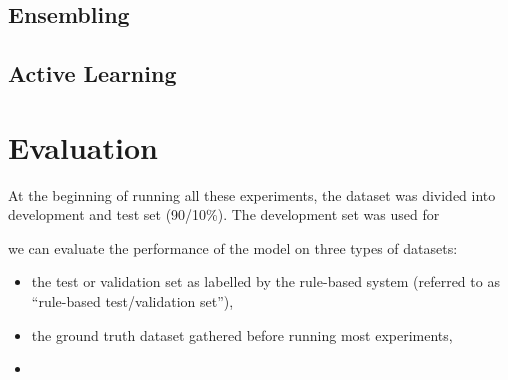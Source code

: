 \subsection{Ensembling}
\label{exp_ensembling}

\subsection{Active Learning}
\label{exp_al}



\section{Evaluation}
\label{evaluation}

At the beginning of running all these experiments, the dataset was divided into development and test set (90/10\%).
The development set was used for


 we can evaluate the performance of the model on three types of datasets:

\begin{itemize}
  \item the test or validation set as labelled by the rule-based system (referred to as ``rule-based test/validation set''),
  \item the ground truth dataset gathered  before running most experiments,
  \item
\end{itemize}
